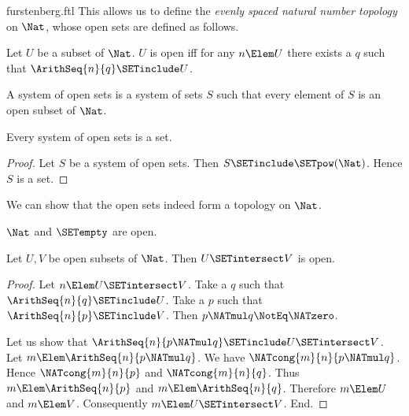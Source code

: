 \documentclass{stex}
\begin{document}
\begin{smodule}{furstenberg.ftl}
This allows us to define the \textit{evenly spaced natural number
topology} on $\Nat$, whose open sets are defined as follows.

\begin{forthel}
  \begin{definition}[for=open]
    Let $U$ be a subset of $\Nat$.
    $U$ is open iff for any $n \Elem U$ there exists a $q$ such that
    $\ArithSeq{n}{q} \SETinclude U$.
  \end{definition}

  \begin{definition}[for=system of open sets]
    A system of open sets is a system of sets $S$ such that every element of
    $S$ is an open subset of $\Nat$.
  \end{definition}

  \begin{lemma}
    Every system of open sets is a set.
  \end{lemma}
  \begin{proof}
    Let $S$ be a system of open sets.
    Then $S \SETinclude \SETpow(\Nat)$.
    Hence $S$ is a set.
  \end{proof}
\end{forthel}

We can show that the open sets indeed form a topology on $\Nat$.

\begin{forthel}
  \begin{lemma}
    $\Nat$ and $\SETempty$ are open.
  \end{lemma}

  \begin{lemma}
    Let $U,V$ be open subsets of $\Nat$.
    Then $U \SETintersect V$ is open.
  \end{lemma}
  \begin{proof}
    Let $n \Elem U \SETintersect V$.
    Take a $q$ such that $\ArithSeq{n}{q} \SETinclude U$.
    Take a $p$ such that $\ArithSeq{n}{p} \SETinclude V$.
    Then $p \NATmul q \NotEq \NATzero$.

    Let us show that $\ArithSeq{n}{p \NATmul q} \SETinclude U \SETintersect V$.
      Let $m \Elem \ArithSeq{n}{p \NATmul q}$.
      We have $\NATcong{m}{n}{p \NATmul q}$.
      Hence $\NATcong{m}{n}{p}$ and $\NATcong{m}{n}{q}$.
      Thus $m \Elem \ArithSeq{n}{p}$ and $m \Elem \ArithSeq{n}{q}$.
      Therefore $m \Elem U$ and $m \Elem V$.
      Consequently $m \Elem U \SETintersect V$.
    End.
  \end{proof}


\end{forthel}
\end{smodule}
\end{document}
